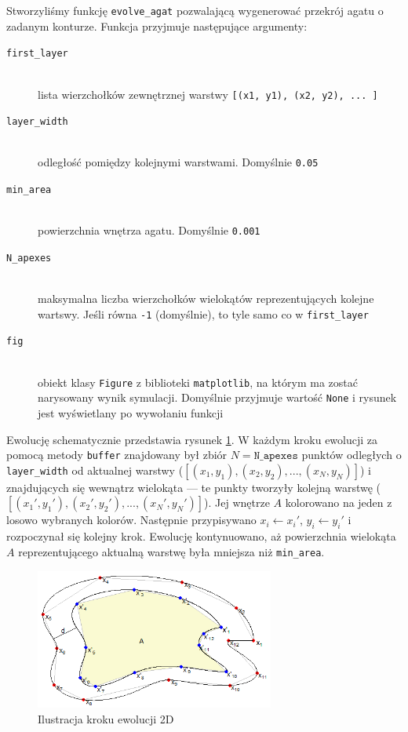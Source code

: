 \documentclass{article}
\begin{document}
Stworzyliśmy funkcję \texttt{evolve\_agat} pozwalającą wygenerować przekrój agatu o zadanym konturze. Funkcja przyjmuje następujące argumenty:
\begin{description}
\item[\texttt{first\_layer}] \hfill \\
lista wierzchołków zewnętrznej warstwy \texttt{[(x1, y1), (x2, y2), ... ]}
\item[\texttt{layer\_width}] \hfill \\
odległość pomiędzy kolejnymi warstwami. Domyślnie \texttt{0.05}
\item[\texttt{min\_area}] \hfill \\
powierzchnia wnętrza agatu. Domyślnie \texttt{0.001}
\item[\texttt{N\_apexes}] \hfill \\
maksymalna liczba wierzchołków wielokątów reprezentujących kolejne wartswy. Jeśli równa \texttt{-1} (domyślnie), to tyle samo co w \texttt{first\_layer}
\item[\texttt{fig}] \hfill \\
obiekt klasy \texttt{Figure} z biblioteki \texttt{matplotlib}, na którym ma zostać narysowany wynik symulacji. Domyślnie przyjmuje wartość \texttt{None} i rysunek jest wyświetlany po wywołaniu funkcji
\end{description}

Ewolucję schematycznie przedstawia rysunek \ref{ewolucja_2d}. W każdym kroku ewolucji za pomocą metody \texttt{buffer} znajdowany był zbiór $N=\texttt{N\_apexes}$ punktów odległych o \texttt{layer\_width} od aktualnej warstwy ($[(x_1,y_1), (x_2, y_2), ..., (x_N, y_N)]$) i znajdujących się wewnątrz wielokąta --- te punkty tworzyły kolejną warstwę ($[(x_1',y_1'), (x_2', y_2'), ..., (x_N', y_N')]$). Jej wnętrze $A$ kolorowano na jeden z losowo wybranych kolorów. Następnie przypisywano $x_i \leftarrow x_i'$, $y_i \leftarrow y_i'$ i rozpoczynał się kolejny krok. Ewolucję kontynuowano, aż powierzchnia wielokąta $A$ reprezentującego aktualną warstwę była mniejsza niż \texttt{min\_area}.
\begin{figure}[H]
\caption{Ilustracja kroku ewolucji 2D}
\label{ewolucja_2d}
\centering
\includegraphics[width=0.7\textwidth]{obrazy/ewolucja2d.png}
\end{figure}
\end{document}
